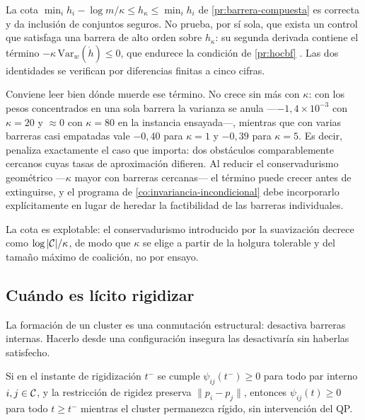 \begin{observacion}
\label{obs:softmin-curvatura}
La cota $\min_i h_i-\log m/\kappa\le h_\kappa\le\min_i h_i$ de
\cref{pr:barrera-compuesta} es correcta y da inclusión de conjuntos seguros.
No prueba, por sí sola, que exista un control que satisfaga una barrera de alto
orden sobre $h_\kappa$: su segunda derivada contiene el término
$-\kappa\,\mathrm{Var}_w(\dot h)\le0$, que
endurece la condición de \cref{pr:hocbf} \cite{mayorga2026m1}. Las dos
identidades se verifican por diferencias finitas a cinco cifras.

Conviene leer bien dónde muerde ese término. No crece sin más con $\kappa$: con
los pesos concentrados en una sola barrera la varianza se anula
—$-1{,}4\times10^{-3}$ con $\kappa=20$ y $\approx0$ con $\kappa=80$ en la
instancia ensayada—, mientras que con varias barreras casi empatadas vale
$-0{,}40$ para $\kappa=1$ y $-0{,}39$ para $\kappa=5$. Es decir, penaliza
exactamente el caso que importa: dos obstáculos comparablemente cercanos cuyas
tasas de aproximación difieren. Al reducir el conservadurismo geométrico
—$\kappa$ mayor con barreras cercanas— el término puede crecer antes de
extinguirse, y el programa de \cref{co:invariancia-incondicional} debe
incorporarlo explícitamente en lugar de heredar la factibilidad de las barreras
individuales.
\end{observacion}

La cota es explotable: el conservadurismo introducido por la suavización decrece
como $\log|\mathcal{C}|/\kappa$, de modo que $\kappa$ se elige a partir de la holgura
tolerable y del tamaño máximo de coalición, no por ensayo.

\subsection{Cuándo es lícito rigidizar}

La formación de un cluster es una conmutación estructural: desactiva barreras
internas. Hacerlo desde una configuración insegura las desactivaría sin haberlas
satisfecho.

\begin{proposicion}
\label{pr:rigidizacion-admisible}
Si en el instante de rigidización $t^-$ se cumple $\psi_{ij}(t^-)\ge0$ para todo
par interno $i,j\in\mathcal{C}$, y la restricción de rigidez preserva
$\|p_i-p_j\|$, entonces $\psi_{ij}(t)\ge0$ para todo $t\ge t^{-}$ mientras el
cluster permanezca rígido, sin intervención del QP.
\end{proposicion}

